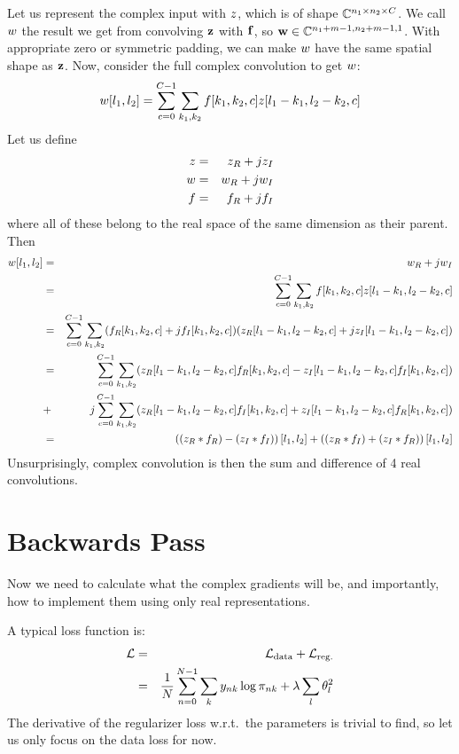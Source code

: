 Let us represent the complex input with $\SigIn$, which is of shape
$\complexes[n_1\x n_2\x C]$. We call $\SigOut$ the result we get from convolving
$\SigInB$ with $\FilterB$, so $\SigOutB \in \complexes[n_1 + m - 1, n_2 + m -1, 1]$. With
appropriate zero or symmetric padding, we can make $\SigOut$ have the same
spatial shape as $\SigInB$. Now, consider the full complex convolution to get
$\SigOut$:
\begin{equation}
 \SigOut[l_1,l_2] = \sum_{c=0}^{C-1} \sum_{k_1,k_2} \Filter[k_1,k_2,c] \SigIn[l_1-k_1,l_2-k_2,c]
\end{equation}
Let us define 
\begin{eqnarray}
  \SigIn & = & \SigIn_R +j\SigIn_I \\
  \SigOut & = & \SigOut_R +j\SigOut_I \\
  \Filter & = & \Filter_R + j\Filter_I
\end{eqnarray}
where all of these belong to the real space of the same dimension as their
parent. Then
\begin{eqnarray}
  \SigOut[l_1, l_2] & = &  \SigOut_R +j\SigOut_I \\
      & = &\sum_{c=0}^{C-1} \sum_{k_1,k_2} \Filter[k_1,k_2,c] \SigIn[l_1-k_1,l_2-k_2,c]\\
      & = &\sum_{c=0}^{C-1} \sum_{k_1,k_2} (\Filter_R[k_1,k_2,c] +j\Filter_I[k_1,k_2,c]) 
        (\SigIn_R[l_1-k_1,l_2-k_2,c]+ j\SigIn_I[l_1-k_1,l_2-k_2,c])\\
      & = & \sum_{c=0}^{C-1} \sum_{k_1,k_2} (
          \SigIn_R[l_1-k_1,l_2-k_2,c] \Filter_R[k_1,k_2,c] - 
          \SigIn_I[l_1-k_1,l_2-k_2,c] \Filter_I[k_1,k_2,c]) \\
      & +& j\sum_{c=0}^{C-1} \sum_{k_1,k_2} (\SigIn_R[l_1-k_1,l_2-k_2,c] \Filter_I[k_1,k_2,c] + 
          \SigIn_I[l_1-k_1,l_2-k_2,c] \Filter_R[k_1,k_2,c]) \\
      &=& \left((\SigIn_R \ast \Filter_R) - (\SigIn_I \ast \Filter_I)\right)[l_1,l_2] + 
          \left((\SigIn_R \ast \Filter_I) + (\SigIn_I \ast \Filter_R)\right)[l_1,l_2]
\end{eqnarray}
Unsurprisingly, complex convolution is then the sum and difference of 4 real convolutions.

\section{Backwards Pass}  
  \renewcommand{\dataloss}{\logloss_{\text{data}}}
  \renewcommand{\SigIn}{z}
  \renewcommand{\SigOut}{w}
  \renewcommand{\Filter}{f}
  
Now we need to calculate what the complex gradients will be, and importantly,
how to implement them using only real representations.

A typical loss function is:
\begin{eqnarray}
  \logloss &=& \dataloss + \logloss_{\text{reg.}} \\
    &=& \frac{1}{N}\sum_{n=0}^{N-1} \sum_{k} y_{nk}\log \pi_{nk} + \lambda
    \sum_l \theta_l^2
\end{eqnarray}
The derivative of the regularizer loss w.r.t.\ the parameters is trivial to
find, so let us only focus on the data loss for now.

